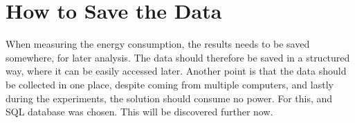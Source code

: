 \section{How to Save the Data}\label{sec:save_data}

When measuring the energy consumption, the results needs to be saved somewhere, for later analysis. The data should therefore be saved in a structured way, where it can be easily accessed later. Another point is that the data should be collected in one place, despite coming from multiple computers, and lastly during the experiments, the solution should consume no power. For this, and SQL database was chosen. This will be discovered further now.

